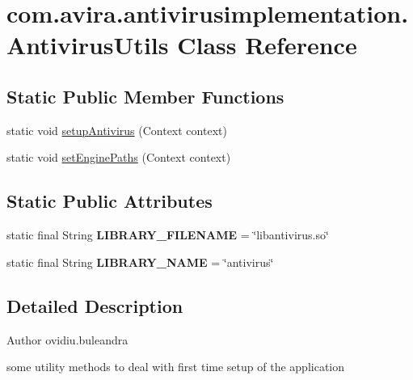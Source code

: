 \hypertarget{classcom_1_1avira_1_1antivirusimplementation_1_1_antivirus_utils}{}\section{com.\+avira.\+antivirusimplementation.\+Antivirus\+Utils Class Reference}
\label{classcom_1_1avira_1_1antivirusimplementation_1_1_antivirus_utils}
\subsection*{Static Public Member Functions}
\begin{DoxyCompactItemize}
\item 
static void \hyperlink{classcom_1_1avira_1_1antivirusimplementation_1_1_antivirus_utils_ae3b141ff8bbafed459520fb80b3aa82d}{setup\+Antivirus} (Context context)
\item 
static void \hyperlink{classcom_1_1avira_1_1antivirusimplementation_1_1_antivirus_utils_a7ea66a194e43464830cedc2cedc3d40a}{set\+Engine\+Paths} (Context context)
\end{DoxyCompactItemize}
\subsection*{Static Public Attributes}
\begin{DoxyCompactItemize}
\item 
\hypertarget{classcom_1_1avira_1_1antivirusimplementation_1_1_antivirus_utils_a029724ce0cc7a6ddff2c697acdd0b1df}{}static final String {\bfseries L\+I\+B\+R\+A\+R\+Y\+\_\+\+F\+I\+L\+E\+N\+A\+M\+E} = \char`\"{}libantivirus.\+so\char`\"{}\label{classcom_1_1avira_1_1antivirusimplementation_1_1_antivirus_utils_a029724ce0cc7a6ddff2c697acdd0b1df}

\item 
\hypertarget{classcom_1_1avira_1_1antivirusimplementation_1_1_antivirus_utils_af19356c61cf635aa9e97d3b192ee0fbf}{}static final String {\bfseries L\+I\+B\+R\+A\+R\+Y\+\_\+\+N\+A\+M\+E} = \char`\"{}antivirus\char`\"{}\label{classcom_1_1avira_1_1antivirusimplementation_1_1_antivirus_utils_af19356c61cf635aa9e97d3b192ee0fbf}

\end{DoxyCompactItemize}


\subsection{Detailed Description}
\begin{DoxyAuthor}{Author}
ovidiu.\+buleandra
\end{DoxyAuthor}
some utility methods to deal with first time setup of the application

